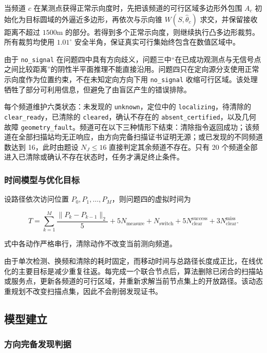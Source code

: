 当频道 $c$ 在某测点获得正常示向度时，先把该频道的可行区域多边形外包围 $A_c$ 初始化为目标圆域的外逼近多边形，再依次与示向锥 $W(S,\hat\theta_c)$ 求交，并保留接收距离不超过 $1500\mathrm{m}$ 的部分。若得到多个正常示向度，则继续执行凸多边形裁剪\cite{sutherland1974}。所有裁剪均使用 $1.01^\circ$ 安全半角，保证真实可行集始终包含在数值区域中。

由于 \texttt{no\_signal} 在问题四中具有方向歧义，问题三中“在已成功观测点与无信号点之间比较距离”的阴性半平面推理不能直接沿用。问题四只在定向源分支使用正常示向度作为位置约束，不在未知定向方向下用 \texttt{no\_signal} 收缩可行区域。该处理牺牲了部分可利用信息，但避免了由盲区产生的错误排除。

每个频道维护六类状态：未发现的 \texttt{unknown}，定位中的 \texttt{localizing}，待清除的 \texttt{clear\_ready}，已清除的 \texttt{cleared}，确认不存在的 \texttt{absent\_certified}，以及几何故障 \texttt{geometry\_fault}。频道可在以下三种情形下结束：清除指令返回成功；该频道在全部扫描站均无正响应，由方向完备扫描证书证明无源；或已发现的不同频道数达到 16，此时由题设 $N_J\le16$ 直接判定其余频道不存在。只有 20 个频道全部进入已清除或确认不存在状态时，任务才满足终止条件。

\subsubsection{时间模型与优化目标}

设路径依次访问位置 $P_0,P_1,\ldots,P_M$，则问题四的虚拟时间为

\begin{equation}
T=\sum_{k=1}^{M}\frac{\lVert P_k-P_{k-1}\rVert_2}{5}
+5N_{\mathrm{measure}}+N_{\mathrm{switch}}
+5N_{\mathrm{clear}}^{\mathrm{success}}+3N_{\mathrm{clear}}^{\mathrm{miss}}.
\label{eq:q4_total_time}
\end{equation}

式中各动作严格串行，清除动作不改变当前测向频道。

由于单次检测、换频和清除的耗时固定，而移动时间与总路径长度成正比，在线优化的主要目标是减少重复往返。每完成一个联合节点后，算法删除已闭合的扫描站或服务点，更新各频道的可行区域，并重新求解当前节点集上的开放路径。该动态重规划不改变扫描点集，因此不会削弱发现证书。

\subsection{模型建立}

\subsubsection{方向完备发现判据}

